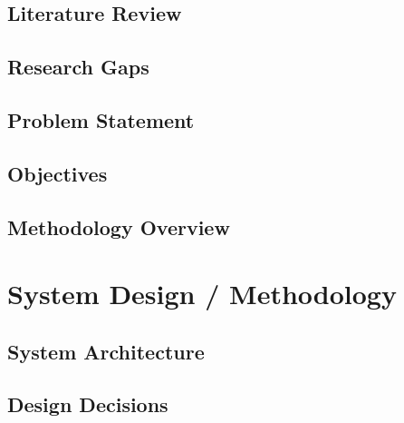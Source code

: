 \documentclass[12pt,a4paper]{report}
\numberwithin{equation}{chapter}
\begin{document}

\section{Literature Review}

\section{Research Gaps}

\section{Problem Statement}

\section{Objectives}

\section{Methodology Overview}

\chapter{System Design / Methodology}
\label{ch:design}


\section{System Architecture}

\section{Design Decisions}
\end{document}
